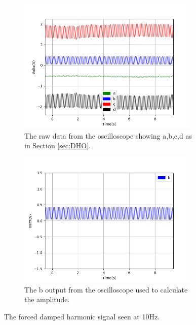 \begin{figure}[h!]
\centering
\begin{subfigure}[t]{.475\textwidth}
  \centering
  \includegraphics[width=0.95\textwidth, height=0.20\textheight]{figures/FDHO/scope_39raw.png}
  \caption{The raw data from the oscilloscope showing a,b,c,d as in Section \ref{sec:DHO}.}
 \label{fig:FDHO_10Hz_raw}
\end{subfigure}\hfill
\begin{subfigure}[t]{.475\textwidth}
  \centering
  \includegraphics[width=0.95\textwidth, height=0.20\textheight]{figures/FDHO/scope_39v_2.png}
  \caption{The b output from the oscilloscope used to calculate the amplitude.}
\label{fig:FDHO_10Hz_b}
\end{subfigure}
\caption{The forced damped harmonic signal seen at 10Hz.}
\label{fig:FDHO_10Hz}
\end{figure}

